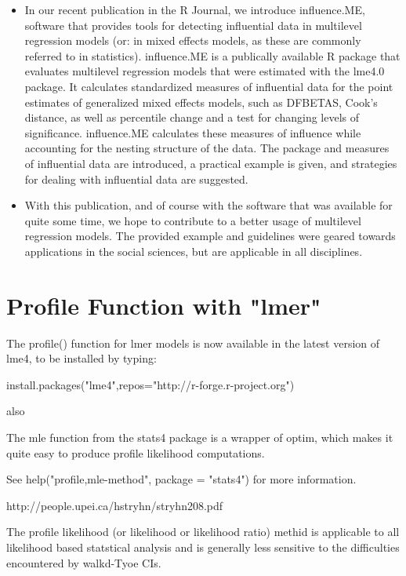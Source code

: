 \documentclass[12pt, a4paper]{article}
\begin{document}
\begin{itemize}
	\item In our recent publication in the R Journal, we introduce influence.ME, software that provides tools for detecting influential data in multilevel regression models (or: in mixed effects models, as these are commonly referred to in statistics). influence.ME is a publically available R package that evaluates multilevel regression models that were estimated with the lme4.0 package. It calculates standardized measures of influential data for the point estimates of generalized mixed effects models, such as DFBETAS, Cook’s distance, as well as percentile change and a test for changing levels of significance. influence.ME calculates these measures of influence while accounting for the nesting structure of the data. The package and measures of influential data are introduced, a practical example is given, and strategies for dealing with influential data are suggested.
	
	\item With this publication, and of course with the software that was available for quite some time, we hope to contribute to a better usage of multilevel regression models. The provided example and guidelines were geared towards applications in the social sciences, but are applicable in all disciplines.
\end{itemize}


\section{Profile Function with "lmer"}

The profile() function for lmer models is now available in the latest version of lme4, to be installed by typing:

install.packages("lme4",repos="http://r-forge.r-project.org")

also

The mle function from the stats4 package is a wrapper of optim, which makes it quite easy to produce 
profile likelihood computations. 

See help("profile,mle-method", package = "stats4") for more information.


http://people.upei.ca/hstryhn/stryhn208.pdf

The profile likelihood (or likelihood or likelihood ratio) methid is applicable to 
all likelihood based statstical analysis and is generally less sensitive to the difficulties
encountered by walkd-Tyoe CIs.
\end{document}

